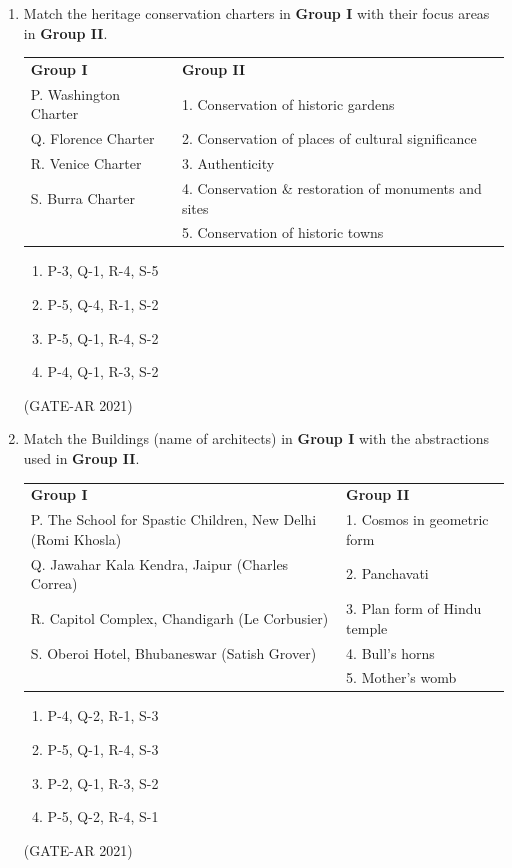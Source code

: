 \documentclass[a4paper,10pt]{article}
\begin{document}
\begin{enumerate}
    \item Match the heritage conservation charters in \textbf{Group I} with their focus areas in \textbf{Group II}. \\
    \begin{tabular}{ l l }
    \textbf{Group I} & \textbf{Group II} \\
    P. Washington Charter & 1. Conservation of historic gardens \\
    Q. Florence Charter & 2. Conservation of places of cultural significance \\
    R. Venice Charter & 3. Authenticity \\
    S. Burra Charter & 4. Conservation \& restoration of monuments and sites \\
    & 5. Conservation of historic towns \\
    \end{tabular}
    \begin{multicols}{2}
    \begin{enumerate}
        \item P-3, Q-1, R-4, S-5
        \item P-5, Q-4, R-1, S-2
        \item P-5, Q-1, R-4, S-2
        \item P-4, Q-1, R-3, S-2
    \end{enumerate}
    \end{multicols}
    \hfill (GATE-AR 2021)

    \item Match the Buildings (name of architects) in \textbf{Group I} with the abstractions used in \textbf{Group II}. \\
    \begin{tabular}{ l l }
    \textbf{Group I} & \textbf{Group II} \\
    P. The School for Spastic Children, New Delhi (Romi Khosla) & 1. Cosmos in geometric form \\
    Q. Jawahar Kala Kendra, Jaipur (Charles Correa) & 2. Panchavati \\
    R. Capitol Complex, Chandigarh (Le Corbusier) & 3. Plan form of Hindu temple \\
    S. Oberoi Hotel, Bhubaneswar (Satish Grover) & 4. Bull's horns \\
    & 5. Mother's womb \\
    \end{tabular}
    \begin{multicols}{2}
    \begin{enumerate}
        \item P-4, Q-2, R-1, S-3
        \item P-5, Q-1, R-4, S-3
        \item P-2, Q-1, R-3, S-2
        \item P-5, Q-2, R-4, S-1
    \end{enumerate}
    \end{multicols}
    \hfill (GATE-AR 2021)


\end{enumerate}
\end{document}
